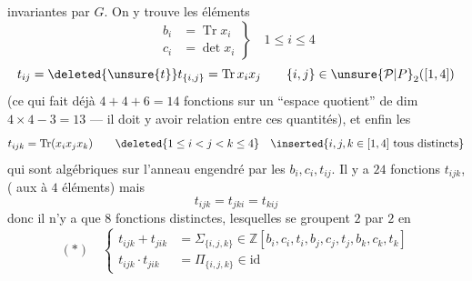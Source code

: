 invariantes par $G$. On y trouve les éléments
\[
\left.\begin{aligned}
b_i&=\operatorname{Tr}x_i\\
c_i&=\det x_i
\end{aligned}\right\}\quad 1\leq i\leq4
\]
\[
t_{ij}=\deleted{\unsure{t}}t_{\{i,j\}}=\operatorname{Tr}x_i x_j
\qquad \{i,j\}\in\unsure{\mathcal P|P}_2([1,4])
\]
(ce qui fait déjà $4+4+6=14$ fonctions sur un ``espace quotient'' de dim
$4\times4-3=13$ --- il doit y avoir 
relation entre ces quantités), et enfin les
\[
t_{ijk}=\operatorname{Tr}(x_i x_j x_k)
\qquad
\deleted{1\leq i<j<k\leq4}\quad
\inserted{i,j,k\in[1,4]\text{ tous distincts}}
\]
qui sont algébriques sur l'anneau engendré par les $b_i,c_i,t_{ij}$.
Il y a $24$ fonctions $t_{ijk}$, 
( aux  à $4$ éléments) mais
\[
t_{ijk}=t_{jki}=t_{kij}
\]
donc il n'y a que $8$ fonctions distinctes, lesquelles se groupent $2$ par $2$ en
\[
(*)\quad\left\{\begin{aligned}
t_{ijk}+t_{jik}&=\Sigma_{\{i,j,k\}}
 \in\mathbb Z[b_i,c_i,t_i,b_j,c_j,t_j,b_k,c_k,t_k]\\
t_{ijk}\cdot t_{jik}&=\Pi_{\{i,j,k\}}\in\text{id}
\end{aligned}\right.
\]

